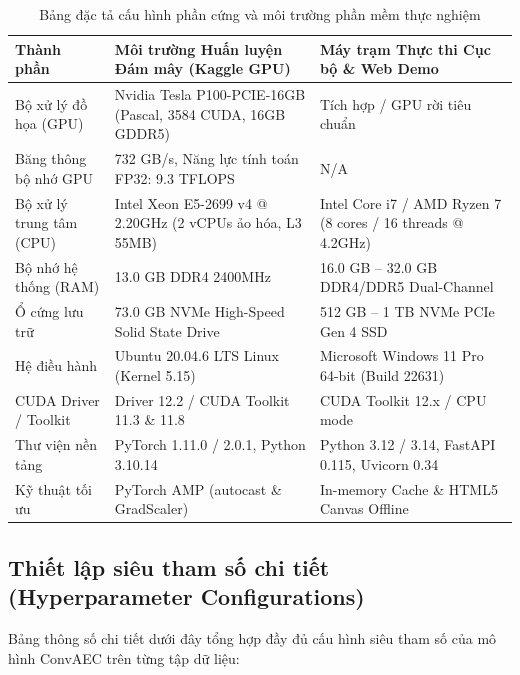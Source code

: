 \documentclass[11pt,journal,onecolumn]{IEEEtran}
\begin{document}
\begin{table}[htbp]
\centering
\caption{Bảng đặc tả cấu hình phần cứng và môi trường phần mềm thực nghiệm}
\label{tab:hardware_specs}
\begin{tabular}{lll}
\toprule
\textbf{Thành phần} & \textbf{Môi trường Huấn luyện Đám mây (Kaggle GPU)} & \textbf{Máy trạm Thực thi Cục bộ \& Web Demo} \\
\midrule
Bộ xử lý đồ họa (GPU) & Nvidia Tesla P100-PCIE-16GB (Pascal, 3584 CUDA, 16GB GDDR5) & Tích hợp / GPU rời tiêu chuẩn \\
Băng thông bộ nhớ GPU & 732 GB/s, Năng lực tính toán FP32: 9.3 TFLOPS & N/A \\
Bộ xử lý trung tâm (CPU) & Intel Xeon E5-2699 v4 @ 2.20GHz (2 vCPUs ảo hóa, L3 55MB) & Intel Core i7 / AMD Ryzen 7 (8 cores / 16 threads @ 4.2GHz) \\
Bộ nhớ hệ thống (RAM) & 13.0 GB DDR4 2400MHz & 16.0 GB -- 32.0 GB DDR4/DDR5 Dual-Channel \\
Ổ cứng lưu trữ & 73.0 GB NVMe High-Speed Solid State Drive & 512 GB -- 1 TB NVMe PCIe Gen 4 SSD \\
Hệ điều hành & Ubuntu 20.04.6 LTS Linux (Kernel 5.15) & Microsoft Windows 11 Pro 64-bit (Build 22631) \\
CUDA Driver / Toolkit & Driver 12.2 / CUDA Toolkit 11.3 \& 11.8 & CUDA Toolkit 12.x / CPU mode \\
Thư viện nền tảng & PyTorch 1.11.0 / 2.0.1, Python 3.10.14 & Python 3.12 / 3.14, FastAPI 0.115, Uvicorn 0.34 \\
Kỹ thuật tối ưu & PyTorch AMP (autocast \& GradScaler) & In-memory Cache \& HTML5 Canvas Offline \\
\bottomrule
\end{tabular}
\end{table}

\subsection{Thiết lập siêu tham số chi tiết (Hyperparameter Configurations)}
\label{subsec:hyperparameters}
Bảng thông số chi tiết dưới đây tổng hợp đầy đủ cấu hình siêu tham số của mô hình ConvAEC trên từng tập dữ liệu:
\end{document}
